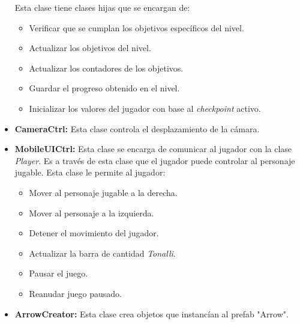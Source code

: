 \begin{itemize}
\begin{itemize}
			\end{itemize}
			Esta clase tiene clases hijas que se encargan de:
				\begin{itemize}
					\item Verificar que se cumplan los objetivos específicos del nivel.
					\item Actualizar los objetivos del nivel.
					\item Actualizar los contadores de los objetivos.
					\item Guardar el progreso obtenido en el nivel.
					\item Inicializar los valores del jugador con base al \textit{checkpoint} activo. 
				\end{itemize}
			\item \textbf{CameraCtrl:} Esta clase controla el desplazamiento de la cámara.
			\item \textbf{MobileUICtrl:} Esta clase se encarga de comunicar al jugador 
			con la clase \textit{Player}. Es a través de esta clase que el jugador puede controlar 
			al personaje jugable. Esta clase le permite al jugador:
			\begin{itemize}
				\item Mover al personaje jugable a la derecha.
				\item Mover al personaje a la izquierda.
				\item Detener el movimiento del jugador.
				\item Actualizar la barra de cantidad \textit{Tonalli}.
				\item Pausar el juego.
				\item Reanudar juego pausado. 
			\end{itemize}
			\item \textbf{ArrowCreator:} Esta clase crea objetos que instancían al prefab "Arrow".								
		\end{itemize}	